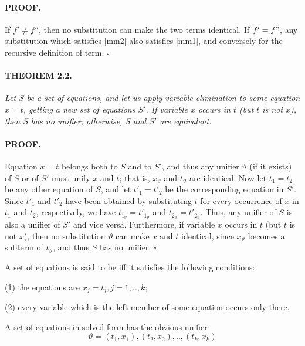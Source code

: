 \paragraph{PROOF.} If $f' \neq f''$, then no substitution can make the
two terms identical.
If $f' = f"$, any substitution which satisfies \ref{mm2} also satisfies
\ref{mm1}, and conversely for the recursive definition of term. $\square$

\paragraph{THEOREM 2.2.} \textit{Let $S$ be a set of equations, and let us apply
variable elimination to some equation $x = t$, getting a new set of equations
$S'$. If variable $x$ occurs in $t$ (but $t$ is not $x$), then $S$ has no
unifier; otherwise, $S$ and $S'$ are equivalent.}

\paragraph{PROOF.} Equation $x = t$ belongs both to $S$ and to $S'$, and thus
any unifier $\vartheta$ (if it exists) of $S$ or of $S'$ must unify $x$ and $t$;
that is, $x_\vartheta$ and $t_\vartheta$ are identical. Now let $t_1 = t_2$ be
any other equation of $S$, and let $t'_1 = t'_2$ be the corresponding equation
in $S'$. Since $t'_1$ and $t'_2$ have been obtained by substituting $t$ for
every occurrence of $x$ in $t_1$ and $t_2$, respectively, we have
$t_{1_\vartheta}=t'_{1_\vartheta}$ and $t_{2_\vartheta}=t'_{2_\vartheta}$. Thus,
any unifier of $S$ is also a unifier of $S'$ and vice versa. Furthermore, if
variable $x$ occurs in $t$ (but $t$ is not $x$), then no substitution
$\vartheta$ can make $x$ and $t$ identical, since $x_\vartheta$ becomes a
subterm of $t_\vartheta$, and thus $S$ has no unifier. $\square$

A set of equations is said to be  iff it satisfies the
following conditions: 

(1) the equations are $x_j = t_j, j = 1,..,k$;

(2) every variable which is the left member of some equation occurs only there.

A set of equations in solved form has the obvious unifier
\[\vartheta = {(t_1,x_1),(t_2,x_2),..,(t_k,x_k)}\]

 
  
\secup